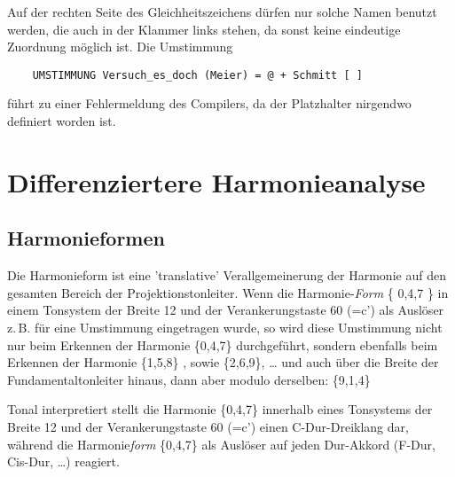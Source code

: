 Auf der rechten Seite des Gleichheitszeichens dürfen nur solche Namen
benutzt werden, die auch in der Klammer links stehen, da sonst keine
eindeutige Zuordnung möglich ist. Die Umstimmung 
\begin{verbatim} 
    UMSTIMMUNG Versuch_es_doch (Meier) = @ + Schmitt [ ]
\end{verbatim}
führt zu einer Fehlermeldung des Compilers, da der Platzhalter 
nirgendwo definiert worden ist. 

\chapter{Differenziertere Harmonieanalyse}\label{cha:diff-harm}

\section{Harmonieformen}\label{sec:harmonieformen}
Die Harmonieform ist eine 'translative' Verallgemeinerung der Harmonie auf 
den gesamten Bereich der Projektionstonleiter. Wenn die Harmonie-\emph{Form} 
\{ 0,4,7 \} in einem Tonsystem der Breite 12 und der Verankerungstaste 60 
(=c') als Auslöser z.\,B. für eine Umstimmung eingetragen wurde, so wird 
diese Umstimmung nicht nur beim Erkennen der Harmonie \{0,4,7\} 
durchgeführt, sondern ebenfalls beim Erkennen der Harmonie \{1,5,8\} , 
sowie \{2,6,9\}, \dots{} und auch über die Breite der Fundamentaltonleiter 
hinaus, dann aber modulo derselben: \{9,1,4\}

Tonal interpretiert stellt die Harmonie \{0,4,7\} innerhalb eines 
Tonsystems der Breite 12 und der Verankerungstaste 60 (=c') einen 
C-Dur-Dreiklang dar, während die Harmonie\emph{form}
 \{0,4,7\} als Auslöser 
auf jeden Dur-Akkord (F-Dur, Cis-Dur, \dots{}) reagiert.

